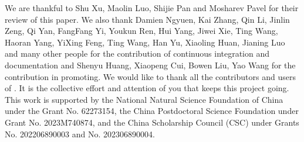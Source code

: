 \documentclass[pra,twocolumn,superscriptaddress,floatfix,nofootinbib,amsmath,amssymb]{revtex4-1}
\numberwithin{equation}{section}
\numberwithin{figure}{section}
\numberwithin{table}{section}
\begin{document}
We are thankful to Shu Xu, Maolin Luo, Shijie Pan and Mosharev Pavel for their review of this paper. We also thank Damien Ngyuen, Kai Zhang, Qin Li, Jinlin Zeng, Qi Yan, FangFang Yi, Youkun Ren, Hui Yang, Jiwei Xie, Ting Wang, Haoran Yang, YiXing Feng, Ting Wang, Han Yu, Xiaoling Huan, Jianing Luo and many other people for the contribution of continuous integration and documentation and Shenyu Huang, Xiaopeng Cui, Bowen Liu, Yao Wang for the contribution in promoting. We would like to thank all the contributors and users of \MindQuantum. It is the collective effort and attention of you that keeps this project going.
This work is supported by the National Natural Science Foundation of China under the Grant No. 62273154, the China Postdoctoral Science Foundation under Grant No. 2023M740874, and the China Scholarship Council (CSC) under Grants No. 202206890003 and No. 202306890004.

\end{document}
